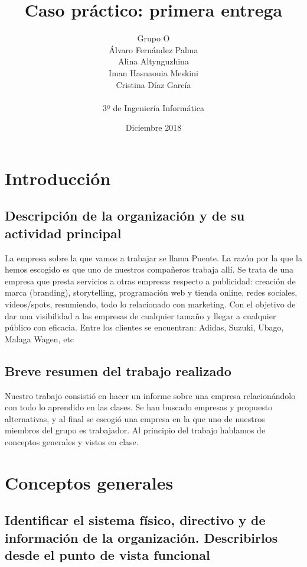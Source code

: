 \documentclass{article}
\title{Caso práctico: primera entrega}
\author{Grupo O\\ Álvaro Fernández Palma\\ Alina Altynguzhina\\ Iman Hasnaouia Meskini\\ Cristina Díaz García\\ \\3º de Ingeniería Informática}
\date{Diciembre 2018}
\begin{document}

\begin{titlingpage}
\maketitle

\end{titlingpage}

\newpage

\tableofcontents

\newpage

\section{Introducción}

\subsection{Descripción de la organización y de su actividad principal} 

La empresa sobre la que vamos a trabajar se llama Puente. La razón por la que la hemos escogido es que uno de nuestros compañeros trabaja allí. Se trata de una empresa que presta servicios a otras empresas respecto a publicidad: creación de marca (branding), storytelling, programación web y tienda online, redes sociales, videos/spots, resumiendo, todo lo relacionado con marketing. Con el objetivo de dar una visibilidad a las empresas de cualquier tamaño y llegar a cualquier público con eficacia. Entre los clientes se encuentran: Adidas, Suzuki, Ubago, Malaga Wagen, etc

\subsection{Breve resumen del trabajo realizado}

Nuestro trabajo consistió en hacer un informe sobre una empresa relacionándolo con todo lo aprendido en las clases.  Se han buscado empresas y propuesto alternativas, y al final se escogió una empresa en la que uno de nuestros miembros del grupo es trabajador. Al principio del trabajo hablamos de conceptos generales y vistos en clase.  

\section{Conceptos generales}

\subsection{Identificar el sistema físico, directivo y de información de la organización. Describirlos desde el punto de vista funcional}
\end{document}
